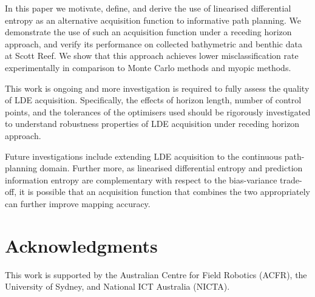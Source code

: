 \documentclass{article}
\begin{document}
	In this paper we motivate, define, and derive the use of linearised differential entropy as an alternative acquisition function to informative path planning. We demonstrate the use of such an acquisition function under a receding horizon approach, and verify its performance on collected bathymetric and benthic data at Scott Reef. We show that this approach achieves lower misclassification rate experimentally in comparison to Monte Carlo methods and myopic methods.
	
	This work is ongoing and more investigation is required to fully assess the quality of LDE acquisition. Specifically, the effects of horizon length, number of control points, and the tolerances of the optimisers used should be rigorously investigated to understand robustness properties of LDE acquisition under receding horizon approach.
	
	Future investigations include extending LDE acquisition to the continuous path-planning domain. Further more, as linearised differential entropy and prediction information entropy are complementary with respect to the bias-variance trade-off, it is possible that an acquisition function that combines the two appropriately can further improve mapping accuracy.
		
\section*{Acknowledgments}

	This work is supported by the Australian Centre for Field Robotics (ACFR), the University of Sydney, and National ICT Australia (NICTA).
	
%
%



\end{document}
